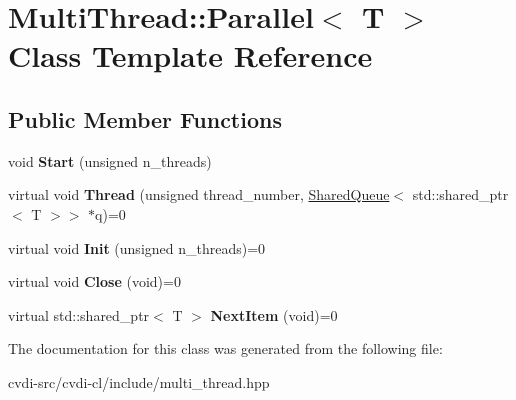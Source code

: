 \hypertarget{classMultiThread_1_1Parallel}{}\section{Multi\+Thread\+:\+:Parallel$<$ T $>$ Class Template Reference}
\label{classMultiThread_1_1Parallel}
\subsection*{Public Member Functions}
\begin{DoxyCompactItemize}
\item 
void {\bfseries Start} (unsigned n\+\_\+threads)\hypertarget{classMultiThread_1_1Parallel_ae84be57a998a93293d74a501149a2731}{}\label{classMultiThread_1_1Parallel_ae84be57a998a93293d74a501149a2731}

\item 
virtual void {\bfseries Thread} (unsigned thread\+\_\+number, \hyperlink{classMultiThread_1_1SharedQueue}{Shared\+Queue}$<$ std\+::shared\+\_\+ptr$<$ T $>$$>$ $\ast$q)=0\hypertarget{classMultiThread_1_1Parallel_a1cfbbbbb3bbaa63437575a1b1e7467b1}{}\label{classMultiThread_1_1Parallel_a1cfbbbbb3bbaa63437575a1b1e7467b1}

\item 
virtual void {\bfseries Init} (unsigned n\+\_\+threads)=0\hypertarget{classMultiThread_1_1Parallel_a610be894ec3b79c02d377c767930d70f}{}\label{classMultiThread_1_1Parallel_a610be894ec3b79c02d377c767930d70f}

\item 
virtual void {\bfseries Close} (void)=0\hypertarget{classMultiThread_1_1Parallel_a5cd9d879caf11db0d36a2b82d7dd3459}{}\label{classMultiThread_1_1Parallel_a5cd9d879caf11db0d36a2b82d7dd3459}

\item 
virtual std\+::shared\+\_\+ptr$<$ T $>$ {\bfseries Next\+Item} (void)=0\hypertarget{classMultiThread_1_1Parallel_a78066be206baeece054d6dd1698ba3f5}{}\label{classMultiThread_1_1Parallel_a78066be206baeece054d6dd1698ba3f5}

\end{DoxyCompactItemize}


The documentation for this class was generated from the following file\+:\begin{DoxyCompactItemize}
\item 
cvdi-\/src/cvdi-\/cl/include/multi\+\_\+thread.\+hpp\end{DoxyCompactItemize}
